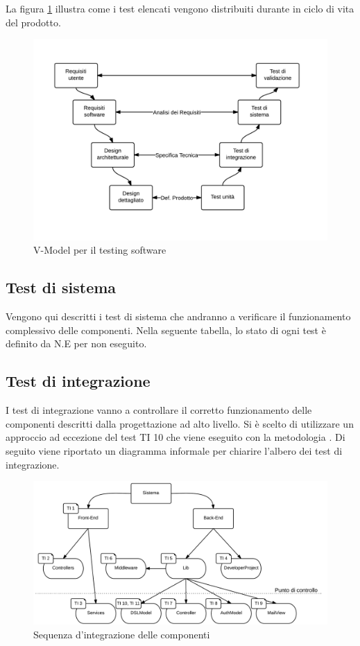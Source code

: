 	La figura \ref{fig:V-Model} illustra come i test elencati vengono distribuiti durante in ciclo di vita del prodotto.

	\begin{figure}[H]
	\centering \includegraphics[width=1\textwidth]{V-Model.png}
	\caption{V-Model per il testing software}
	\label{fig:V-Model}
	\end{figure}

	\subsection{Test di sistema}
	Vengono qui descritti i test di sistema che andranno a verificare il funzionamento complessivo delle componenti.
	Nella seguente tabella, lo stato di ogni test è definito da N.E per non eseguito.
	
	
	
	\subsection{Test di integrazione}
	I test di integrazione vanno a controllare il corretto funzionamento delle componenti descritti dalla progettazione ad alto livello. Si è scelto di utilizzare un approccio  ad eccezione del test TI 10 che viene eseguito con la metodologia . Di seguito viene riportato un diagramma informale per chiarire l'albero dei test di integrazione.

	\begin{figure}[H]
	\centering \includegraphics[width=1\textwidth]{sequenza-di-integrazione.png}
	\caption{Sequenza d'integrazione delle componenti}
	\label{fig:sequenza-di-integrazione}
	\end{figure}

